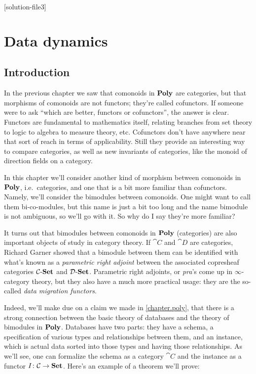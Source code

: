 \documentclass[Book-Poly]{subfiles}
\begin{document}
%


\setcounter{chapter}{2}%
[solution-file3]

\chapter{Data dynamics}\label{chapter.bimod} 

\section{Introduction}\label{sec.c6_intro}


In the previous chapter we saw that comonoids in $\mathbf{Poly}$ are categories, but that morphisms of comonoids are not functors; they're called cofunctors. If someone were to ask ``which are better, functors or cofunctors'', the answer is clear. Functors are fundamental to mathematics itself, relating branches from set theory to logic to algebra to measure theory, etc. Cofunctors don't have anywhere near that sort of reach in terms of applicability. Still they provide an interesting way to compare categories, as well as new invariants of categories, like the monoid of direction fields on a category.

In this chapter we'll consider another kind of morphism between comonoids in $\mathbf{Poly}$, i.e.\ categories, and one that is a bit more familiar than cofunctors. Namely, we'll consider the bimodules between comonoids. One might want to call them bi-co-modules, but this name is just a bit too long and the name bimodule is not ambiguous, so we'll go with it. So why do I say they're more familiar?

It turns out that bimodules between comonoids in $\mathbf{Poly}$ (categories) are also important objects of study in category theory. If $\cat{C}$ and $\cat{D}$ are categories, Richard Garner showed that a bimodule between them can be identified with what's known as a \emph{parametric right adjoint} between the associated copresheaf categories $\mathcal{C}\textnormal{-}\mathbf{Set}$ and $\mathcal{D}\textnormal{-}\mathbf{Set}$. Parametric right adjoints, or \emph{pra}'s come up in $\infty$-category theory, but they also have a much more practical usage: they are the so-called \emph{data migration functors}.

Indeed, we'll make due on a claim we made in \cref{chapter.poly}, that there is a strong connection between the basic theory of databases and the theory of bimodules in $\mathbf{Poly}$. Databases have two parts: they have a schema, a specification of various types and relationships between them, and an instance, which is actual data sorted into those types and having those relationships. As we'll see, one can formalize the schema as a category $\cat{C}$ and the instance as a functor $I\colon\mathcal{C}\to\mathbf{Set}$. Here's an example of a theorem we'll prove:
\end{document}
